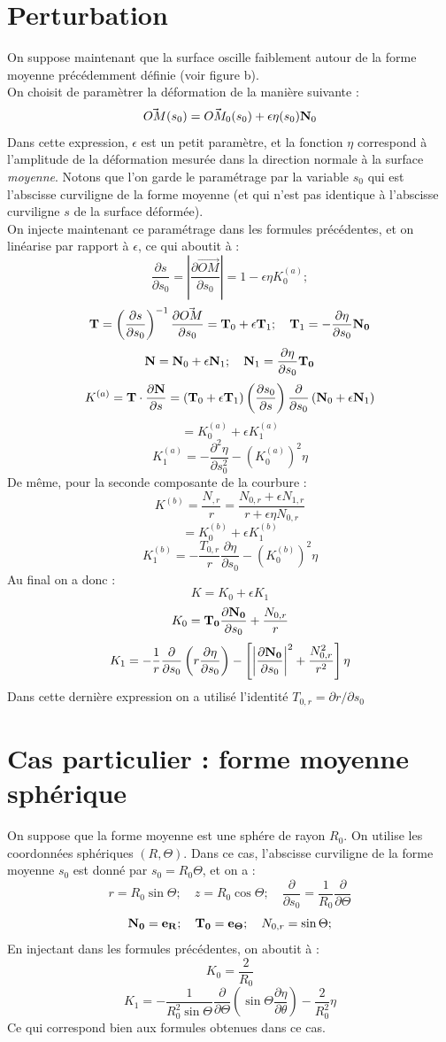 \documentclass[a4paper]{report}
\newcommand\DP[2]{\frac{\partial #1}{\partial #2}}
\begin{document}
\section{Perturbation}
On suppose maintenant que la surface oscille faiblement autour de la forme moyenne précédemment définie (voir figure b).
\\
On choisit de paramètrer la déformation de la manière suivante :
$$
\vec{OM}(s_0)  = \vec{OM_0}(s_0) + \epsilon \eta(s_0) {\bf N}_0
$$
Dans cette expression, $\epsilon$ est un petit paramètre, et la fonction $\eta$ correspond à l'amplitude de la déformation mesurée dans la direction normale à la surface {\em moyenne}. Notons que l'on garde le paramétrage par la variable $s_0$ qui est l'abscisse curviligne de la forme moyenne (et qui n'est pas identique à l'abscisse curviligne $s$ de la surface déformée).
\\
On injecte maintenant ce paramétrage dans les formules précédentes, et on linéarise par rapport à $\epsilon$, ce qui aboutit à :
$$
\DP{s}{s_0} = \left| \DP{\vec{OM}}{s_0} \right| = 1 - \epsilon \eta K_0^{(a)} ;
$$
$$
{\bf T} = \left(\DP{s}{s_0}\right)^{-1} \DP{\vec{OM}}{s_0} = {\bf T}_0 +  \epsilon  {\bf T}_1 ; \quad 
{\bf T}_1 = - \DP{\eta}{s_0}{\bf N_0}
$$
$$
{\bf N} = {\bf N}_0 +  \epsilon  {\bf N}_1 ; \quad 
{\bf N}_1 = \DP{\eta}{s_0}{\bf T_0}
$$
$$
K^{(a)} = {\bf T} \cdot \DP{{\bf N}}{s} =  
\left( {\bf T}_0 +  \epsilon  {\bf T}_1 \right) \left( \DP{s_0}{s} \right) 
 \DP{}{s_0}  \left({\bf N}_0 +  \epsilon  {\bf N}_1 \right)
$$
$$
= K^{(a)}_0 + \epsilon K^{(a)}_1
$$
$$
K^{(a)}_1 = 
-\DP{^2 \eta }{s_0^2} - \left( K^{(a)}_0 \right)^2 \eta 
$$
De même, pour la seconde composante de la courbure :
$$
K^{(b)} = \frac{ N_{,r}}{r} = \frac{ N_{0,r} + \epsilon N_{1,r}}{r + \epsilon \eta N_{0,r}}
$$
$$
= 
K^{(b)}_0 + \epsilon K^{(b)}_1
$$
$$
K^{(b)}_1 = - \frac{T_{0,r}}{r} \DP{\eta}{s_0} -  \left( K^{(b)}_0 \right)^2 \eta 
$$
Au final on a donc :
$$
K = K_0 + \epsilon K_1
$$
$$
K_0   = {\bf T_0} \DP{\bf N_0}{s_0}  + \frac{N_{0,r}}{r}
$$
$$
K_1   = - \frac{1}{r} \DP{}{s_0} \left( r \DP{\eta}{s_0} \right) -
\left[ \left| \DP{\bf N_0}{s_0} \right|^2  + \frac{N_{0,r}^2}{r^2} \right] \eta
$$
Dans cette dernière expression on a utilisé l'identité $T_{0,r} = \partial r / \partial s_0$
\section{Cas particulier : forme moyenne sphérique}
On suppose que la forme moyenne est une sphére de rayon $R_0$. On utilise les coordonnées sphériques $(R,\Theta)$. Dans ce cas, l'abscisse curviligne de la forme moyenne $s_0$ est donné par $s_0  = R_0 \Theta$, et on a :
$$
r = R_0 \sin \Theta ; \quad z = R_0 \cos \Theta; \quad \DP{}{s_0} = \frac{1}{R_0} \DP{}{\Theta}
$$
$$
{\bf N_0} = {\bf e_R} ; \quad {\bf T_0} = {\bf e_\Theta} ; \quad N_{0,r} = \sin \Theta; 
$$
En injectant dans les formules précédentes, on aboutit à :
$$
K_0 = \frac{2}{R_0}
$$
$$ 
K_1 = - \frac{1}{R_0^2 \sin \Theta} \DP{}{\Theta} \left( \sin \Theta \DP{\eta}{\theta} \right) 
- \frac{2}{R_0^2} \eta
$$
Ce qui correspond bien aux formules obtenues dans ce cas.
\end{document}
